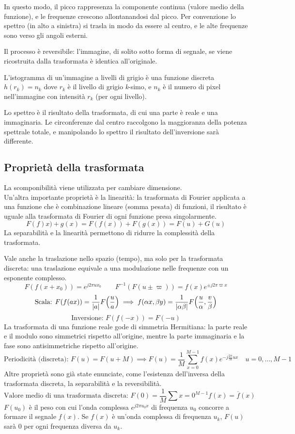 In questo modo, il picco rappresenza la componente continua (valore medio della funzione), e le frequenze crescono allontanandosi dal picco. Per convenzione lo spettro (in alto a sinistra) si trasla in modo da essere al centro, e le alte frequenze sono verso gli angoli esterni.

Il processo è reversibile: l'immagine, di solito sotto forma di segnale, se viene ricostruita dalla trasformata è identica all'originale.

L'istogramma di un'immagine a livelli di grigio è una funzione discreta $h(r_k) = n_k$ dove $r_k$ è il livello di grigio \textit{k}-simo, e $n_k$ è il numero di pixel nell'immagine con intensità $r_k$ (per ogni livello).

Lo spettro è il risultato della trasformata, di cui una parte è reale e una immaginaria. Le circonferenze dal centro raccolgono la maggioranza della potenza spettrale totale, e manipolando lo spettro il risultato dell'inversione sarà differente.

\subsection{Proprietà della trasformata}
La scomponibilità viene utilizzata per cambiare dimensione. \\
Un'altra importante proprietà è la linearità: la trasformata di Fourier applicata a una funzione che è combinazione lineare (somma pesata) di funzioni, il risultato è uguale alla trasformata di Fourier di ogni funzione presa singolarmente. 
$$F(f)x) + g(x) = F(f(x)) + F(g(x)) = F(u) + G(u)$$
La separabilità e la linearità permettono di ridurre la complessità della trasformata.

Vale anche la traslazione nello spazio (tempo), ma solo per la trasformata discreta: una traslazione equivale a una modulazione nelle frequenze con un esponente complesso.
$$F(f(x + x_0)) = e^{j2\pi ux_0} \qquad F^{-1}(F(u \pm \varpi)) = f(x)e^{\pm j2\pi \varpi x}$$
$$\text{Scala: } F(f(ax)) = \frac{1}{\left|a\right|} F\Big(\frac{u}{a}\Big) \implies f(\alpha x, \beta y) = \frac{1}{\left|\alpha \beta\right|} F\Big(\frac{u}{\alpha}, \frac{v}{\beta}\Big)$$
$$\text{Inversione: } F(f(-x)) = F(-u)$$
La trasformata di una funzione reale gode di simmetria Hermitiana: la parte reale e il modulo sono simmetrici rispetto all'origine, mentre la parte immaginaria e la fase sono antisimmetriche rispetto all'origine.
$$\text{Periodicità (discreta): } F(u) = F(u + M) \implies F(u) = \frac{1}{M} \sum_{x=0}^{M-1} f(x)e^{-j\frac{2\pi}{M}ux} \quad u = 0, \dots, M - 1$$
Altre proprietà sono già state enunciate, come l'esistenza dell'inversa della trasformata discreta, la separabilità e la reversibilità.
$$\text{Valore medio di una trasformata discreta: } F(0) = \frac{1}{M} \sum{x=0}^{M-1} f(x) = \overline{f}(x)$$
$F(u_0)$ è il peso con cui l'onda complessa $e^{j2\pi u_0x}$ di frequenza $u_0$ concorre a formare il segnale $f(x)$. Se $f(x)$ è un'onda complessa di frequenza $u_k$, $F(u)$ sarà 0 per ogni frequenza diversa da $u_k$.
